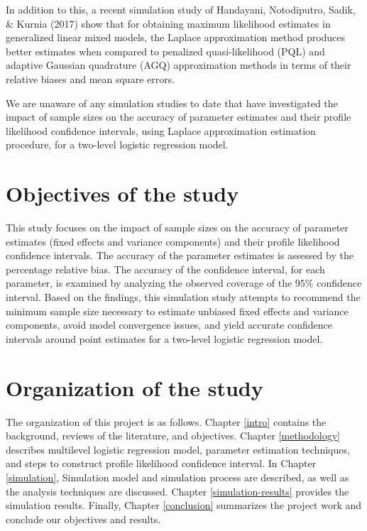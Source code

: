 \documentclass[12pt,oneside,a4paper]{reedthesis}
\begin{document}
In addition to this, a recent simulation study of Handayani, Notodiputro, Sadik, \& Kurnia (2017) show that for obtaining maximum likelihood estimates in generalized linear mixed models, the Laplace approximation method produces better estimates when compared to penalized quasi-likelihood (PQL) and adaptive Gaussian quadrature (AGQ) approximation methods in terms of their relative biases and mean square errors.

We are unaware of any simulation studies to date that have investigated the impact of sample sizes on the accuracy of parameter estimates and their profile likelihood confidence intervals, using Laplace approximation estimation procedure, for a two-level logistic regression model.

\hypertarget{objectives-of-the-study}{%
\section{Objectives of the study}\label{objectives-of-the-study}}

This study focuses on the impact of sample sizes on the accuracy of parameter estimates (fixed effects and variance components) and their profile likelihood confidence intervals.
The accuracy of the parameter estimates is assessed by the percentage relative bias. The accuracy of the confidence interval, for each parameter, is examined by analyzing the observed coverage of the \(95\%\) confidence interval.
Based on the findings, this simulation study attempts to recommend the minimum sample size necessary to estimate unbiased fixed effects and variance components, avoid model convergence issues, and yield accurate confidence intervals around point estimates for a two-level logistic regression model.

\hypertarget{organization-of-the-study}{%
\section{Organization of the study}\label{organization-of-the-study}}

The organization of this project is as follows. Chapter \ref{intro} contains the background, reviews of the literature, and objectives. Chapter \ref{methodology} describes multilevel logistic regression model, parameter estimation techniques, and steps to construct profile likelihood confidence interval. In Chapter \ref{simulation}, Simulation model and simulation process are described, as well as the analysis techniques are discussed. Chapter \ref{simulation-results} provides the simulation results. Finally, Chapter \ref{conclusion} summarizes the project work and conclude our objectives and results.
\end{document}
